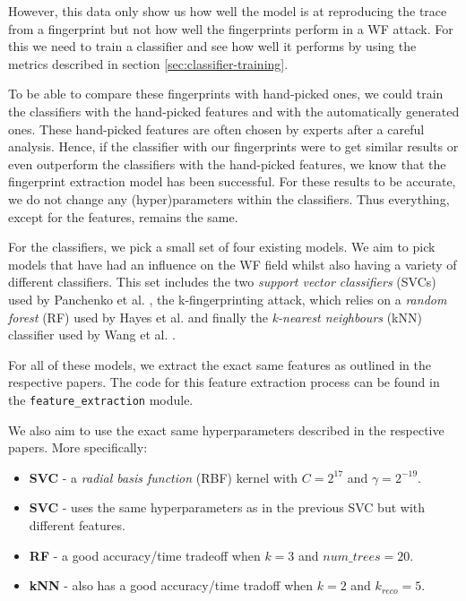However, this data only show us how well the model is at reproducing the trace from a fingerprint but not how well the fingerprints perform in a WF attack.
For this we need to train a classifier and see how well it performs by using the metrics described in section \ref{sec:classifier-training}.

To be able to compare these fingerprints with hand-picked ones, we could train the classifiers with the hand-picked features and with the automatically generated ones.
These hand-picked features are often chosen by experts after a careful analysis.
Hence, if the classifier with our fingerprints were to get similar results or even outperform the classifiers with the hand-picked features, we know that the fingerprint extraction model has been successful.
For these results to be accurate, we do not change any (hyper)parameters within the classifiers.
Thus everything, except for the features, remains the same.

For the classifiers, we pick a small set of four existing models.
We aim to pick models that have had an influence on the WF field whilst also having a variety of different classifiers.
This set includes the two \textit{support vector classifiers} (SVCs) used by Panchenko et al. \cite{panchenko1,panchenko2},
the k-fingerprinting attack, which relies on a \textit{random forest} (RF) used by Hayes et al. \cite{kfingerprinting}
and finally the \textit{k-nearest neighbours} (kNN) classifier used by Wang et al. \cite{wang_cai_johnson_nithyanand_goldberg_2014}.

For all of these models, we extract the exact same features as outlined in the respective papers.
The code for this feature extraction process can be found in the \texttt{feature\_extraction} module.

We also aim to use the exact same hyperparameters described in the respective papers. More specifically:
\begin{itemize}
  \item \textbf{SVC} \cite{panchenko1} - a \textit{radial basis function} (RBF) kernel with $C = 2^{17}$ and $\gamma = 2^{-19}$.
  \item \textbf{SVC} \cite{panchenko2} - uses the same hyperparameters as in the previous SVC but with different features.
  \item \textbf{RF} \cite{kfingerprinting} - a good accuracy/time tradeoff when $k = 3$ and $\textit{num\_trees} = 20$.
  \item \textbf{kNN} \cite{wang_cai_johnson_nithyanand_goldberg_2014} - also has a good accuracy/time tradoff when $k = 2$ and $k_{\textit{reco}} = 5$.
\end{itemize}

